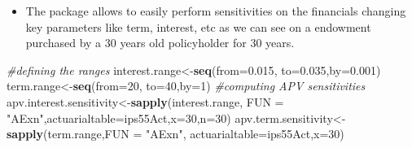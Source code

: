 \documentclass[ignorenonframetext,]{beamer}
\newenvironment{Shaded}{\begin{snugshade}}{\end{snugshade}}
\newcommand{\KeywordTok}[1]{\textcolor[rgb]{0.13,0.29,0.53}{\textbf{{#1}}}}
\newcommand{\DataTypeTok}[1]{\textcolor[rgb]{0.13,0.29,0.53}{{#1}}}
\newcommand{\DecValTok}[1]{\textcolor[rgb]{0.00,0.00,0.81}{{#1}}}
\newcommand{\FloatTok}[1]{\textcolor[rgb]{0.00,0.00,0.81}{{#1}}}
\newcommand{\StringTok}[1]{\textcolor[rgb]{0.31,0.60,0.02}{{#1}}}
\newcommand{\CommentTok}[1]{\textcolor[rgb]{0.56,0.35,0.01}{\textit{{#1}}}}
\newcommand{\NormalTok}[1]{{#1}}
\begin{document}
\begin{frame}[fragile]

\begin{itemize}[<+->]
\itemsep1pt\parskip0pt
\item
  The package allows to easily perform sensitivities on the financials
  changing key parameters like term, interest, etc as we can see on a
  endowment purchased by a 30 years old policyholder for 30 years.
\end{itemize}

\begin{Shaded}
\begin{Highlighting}[]
\CommentTok{#defining the ranges}
\NormalTok{interest.range<-}\KeywordTok{seq}\NormalTok{(}\DataTypeTok{from=}\FloatTok{0.015}\NormalTok{, }\DataTypeTok{to=}\FloatTok{0.035}\NormalTok{,}\DataTypeTok{by=}\FloatTok{0.001}\NormalTok{)}
\NormalTok{term.range<-}\KeywordTok{seq}\NormalTok{(}\DataTypeTok{from=}\DecValTok{20}\NormalTok{, }\DataTypeTok{to=}\DecValTok{40}\NormalTok{,}\DataTypeTok{by=}\DecValTok{1}\NormalTok{)}
\CommentTok{#computing APV sensitivities}
\NormalTok{apv.interest.sensitivity<-}\KeywordTok{sapply}\NormalTok{(interest.range,}
\DataTypeTok{FUN =} \StringTok{"AExn"}\NormalTok{,}\DataTypeTok{actuarialtable=}\NormalTok{ips55Act,}\DataTypeTok{x=}\DecValTok{30}\NormalTok{,}\DataTypeTok{n=}\DecValTok{30}\NormalTok{)}
\NormalTok{apv.term.sensitivity<-}\KeywordTok{sapply}\NormalTok{(term.range,}\DataTypeTok{FUN =} \StringTok{"AExn"}\NormalTok{,}
                             \DataTypeTok{actuarialtable=}\NormalTok{ips55Act,}\DataTypeTok{x=}\DecValTok{30}\NormalTok{)}
\end{Highlighting}
\end{Shaded}

\end{frame}
\end{document}

